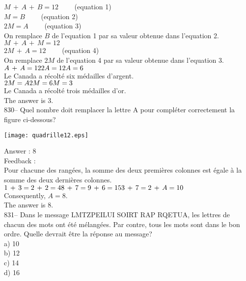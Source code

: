 \documentclass[letterpaper, 12pt]{article}
\begin{document}
$M\,+\,A\,+\,B=12 \qquad$ (equation 1)\\
$M=B \qquad$ (equation 2)\\
$2M=A \qquad$ (equation 3)\\

On remplace $B$ de l'equation 1 par sa valeur obtenue dans l'equation
2.\\
$M\,+\,A\,+\,M=12$\\
$2M\,+\,A=12 \qquad$ (equation 4)\\

On remplace $2M$ de l'equation 4 par sa valeur obtenue dans l'equation
3.\\
$A\,+\,A=12\\
2A = 12\\
A=6$\\
Le Canada a r\'ecolt\'e six m\'edailles d'argent.\\

$2M=A\\
2M=6\\
M=3$\\
Le Canada a r\'ecolt\'e trois m\'edailles d'or.\\


The answer is 3.\\

830-- Quel nombre doit remplacer la lettre A pour compl\'eter correctement
la figure ci-dessous?\\
    \begin{center}
    \texttt{[image: quadrille12.eps]}
    \end{center}


Answer : 8\\

Feedback : \\
Pour chacune des rang\'ees, la somme des deux premi\`eres colonnes est
\'egale \`a la somme des deux derni\`eres colonnes.\\
$1\,+\,3=2\,+\,2=4\\
8\,+\,7=9\,+\,6=15\\
3\,+\,7=2\,+\,A=10$\\
Consequently, $A=8$.\\
The answer is 8.\\

831-- Dans le message \og LMTZPEILUI SOIRT RAP RQETUA\fg , les
lettres de chacun des mots ont \'et\'e m\'elang\'ees.  Par contre,
tous les mots sont dans le
bon ordre.  Quelle devrait \^etre la r\'eponse au message?\\
a) 10\\
b) 12\\
c) 14\\
d)  16\\
\end{document}
